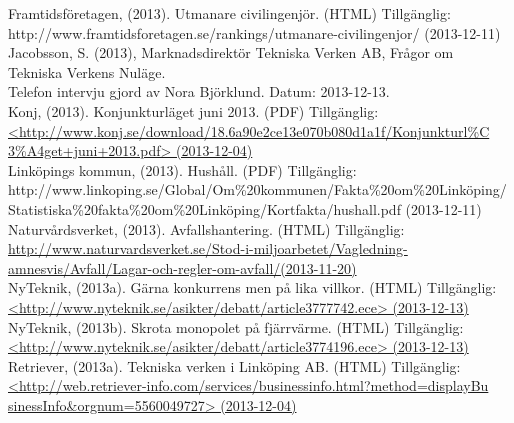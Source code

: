 \documentclass[10pt,a4paper]{article}
\begin{document}
Framtidsföretagen, (2013). Utmanare civilingenjör. (HTML) Tillgänglig: \\
http://www.framtidsforetagen.se/rankings/utmanare-civilingenjor/ (2013-12-11)\\

Jacobsson, S. (2013), Marknadsdirektör Tekniska Verken AB, Frågor om
Tekniska Verkens Nuläge.\\
Telefon intervju gjord av Nora Björklund. Datum: 2013-12-13. \\

Konj, (2013). Konjunkturläget juni 2013. (PDF) Tillgänglig:\\
\hyperref{http://www.konj.se/download/18.6a90e2ce13e070b080d1a1f/Konjunkturl\%C3\%A4get+juni+2013.pdf}{}{}{<http://www.konj.se/download/18.6a90e2ce13e070b080d1a1f/Konjunkturl\%C\\3\%A4get+juni+2013.pdf> (2013-12-04)}\\

Linköpings kommun, (2013). Hushåll. (PDF) Tillgänglig:\\
http://www.linkoping.se/Global/Om\%20kommunen/Fakta\%20om\%20Linköping/\\Statistiska\%20fakta\%20om\%20Linköping/Kortfakta/hushall.pdf (2013-12-11)\\

Naturvårdsverket, (2013). Avfallshantering. (HTML) Tillgänglig: \\
\hyperref{http://www.naturvardsverket.se/Stod-i-miljoarbetet/Vagledning-amnesvis/Avfall/Lagar-och-regler-om-avfall/}{}{}{http://www.naturvardsverket.se/Stod-i-miljoarbetet/Vagledning-amnesvis/Avfall/Lagar-och-regler-om-avfall/(2013-11-20)}\\
NyTeknik, (2013a). Gärna konkurrens men på lika villkor. (HTML)
Tillgänglig: \\
\hyperref{http://www.nyteknik.se/asikter/debatt/article3777742.ece}{}{}{<http://www.nyteknik.se/asikter/debatt/article3777742.ece>
  (2013-12-13)}\\

NyTeknik, (2013b). Skrota monopolet på fjärrvärme. (HTML)
Tillgänglig: \\
\hyperref{http://www.nyteknik.se/asikter/debatt/article3774196.ece}{}{}{<http://www.nyteknik.se/asikter/debatt/article3774196.ece>
  (2013-12-13)}\\

Retriever, (2013a). Tekniska verken i Linköping AB. (HTML) Tillgänglig: \\
\hyperref{http://web.retriever-info.com/services/businessinfo.html?method=displayBusinessInfo\&orgnum=5560049727}{}{}{<http://web.retriever-info.com/services/businessinfo.html?method=displayBu\\sinessInfo\&orgnum=5560049727> (2013-12-04)}\\
\end{document}

